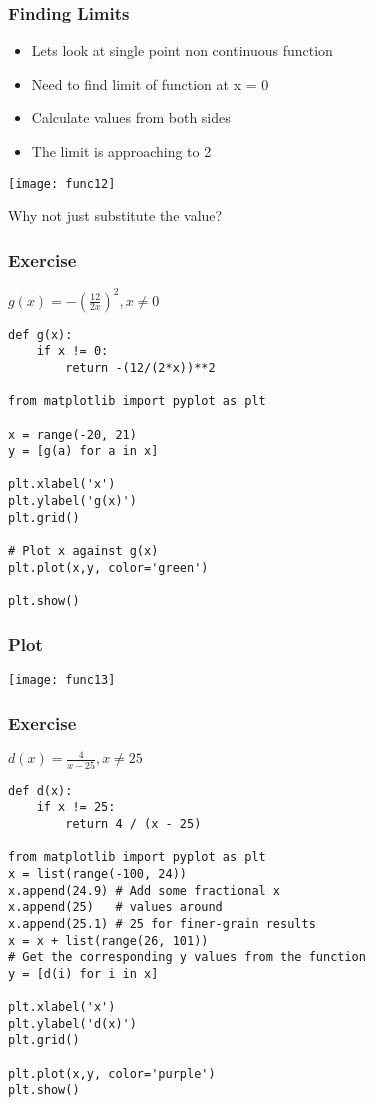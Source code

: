  \begin{frame}[fragile]\frametitle{Finding Limits}
\begin{itemize}
\item Lets look at single point non continuous function
\item Need to find limit of function at x = 0
\item Calculate values from both sides
\item The limit is approaching to 2
\end{itemize}
\begin{center}
\texttt{[image: func12]}
\end{center}
Why not just substitute the value?
\end{frame}



 \begin{frame}[fragile]\frametitle{Exercise}
$g(x) = -(\frac{12}{2x})^2, x \neq 0$

\begin{lstlisting}
def g(x):
    if x != 0:
        return -(12/(2*x))**2
    
from matplotlib import pyplot as plt

x = range(-20, 21)
y = [g(a) for a in x]

plt.xlabel('x')
plt.ylabel('g(x)')
plt.grid()

# Plot x against g(x)
plt.plot(x,y, color='green')

plt.show()
\end{lstlisting}
\end{frame}

 \begin{frame}[fragile]\frametitle{Plot}
\begin{center}
\texttt{[image: func13]}
\end{center}

\end{frame}


 \begin{frame}[fragile]\frametitle{Exercise}
$d(x) = \frac{4}{x-25}, x \neq 25$

\begin{lstlisting}
def d(x):
    if x != 25:
        return 4 / (x - 25)

from matplotlib import pyplot as plt
x = list(range(-100, 24))
x.append(24.9) # Add some fractional x
x.append(25)   # values around
x.append(25.1) # 25 for finer-grain results
x = x + list(range(26, 101))
# Get the corresponding y values from the function
y = [d(i) for i in x]

plt.xlabel('x')
plt.ylabel('d(x)')
plt.grid()

plt.plot(x,y, color='purple')
plt.show()
\end{lstlisting}
\end{frame}

